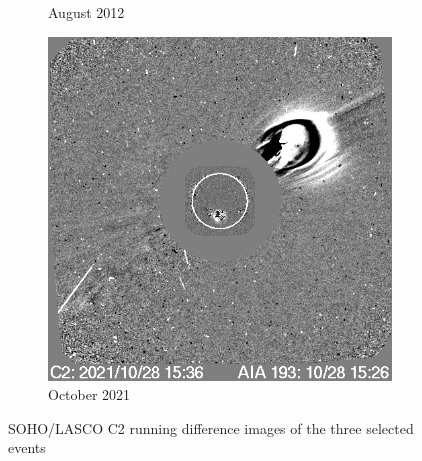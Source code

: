 \begin{figure}[h!]
\begin{subfigure}[b]{0.3\textwidth}
        \caption[August  2012 CME]{August  2012}
        \label{fig:soho_cme_aug_31_2012}
    \end{subfigure}
    \hfill
    \begin{subfigure}[b]{0.3\textwidth}
        \includegraphics[width=\textwidth]{images/soho_cme_oct_28_2021.png}
        \caption[October  2021]{October  2021}
        \label{fig:soho_cme_oct_28_2021}
    \end{subfigure}
    \caption[SOHO/LASCO C2 running difference images of the selected events]{SOHO/LASCO C2 running difference images of the three selected events}
    \label{fig:cme_events_soho_pics}
\end{figure}

